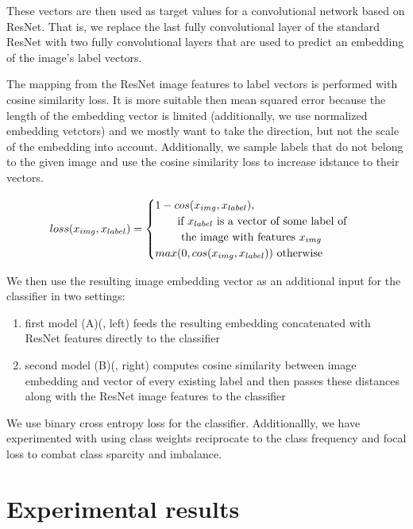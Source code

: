 \documentclass[10pt,twocolumn,letterpaper]{article}
\begin{document}
\par These vectors are then used as target values for a convolutional network based on ResNet\cite{he2015deep}. That is, we replace the last fully convolutional layer of the standard ResNet with two fully convolutional layers that are used to predict an embedding of the image's label vectors.
\par The mapping from the ResNet image features to label vectors is performed with cosine similarity loss. It is more suitable then mean squared error because the length of the embedding vector is limited (additionally, we use normalized embedding vetctors) and we mostly want to take the direction, but not the scale of the embedding into account. Additionally, we sample labels that do not belong to the given image and use the cosine similarity loss to increase idstance to their vectors.

\begin{align*}
loss(x_{img}, x_{label}) =
\begin{cases}
1-cos(x_{img}, x_{label}), \\ \text{\qquad if $x_{label}$ is a vector of some label of } \\ \text{ \qquad the image with features $x_{img}$}\\
max(0, cos(x_{img}, x_{label})) \text{ otherwise}
\end{cases}
\end{align*}
\par We then use the resulting image embedding vector as an additional input for the classifier in two settings:
\begin{enumerate}
	\item first model (A)(\cite{fig:arch}, left) feeds the resulting embedding concatenated with ResNet features directly to the classifier
	\item second model (B)(\cite{fig:arch}, right) computes cosine similarity between image embedding and vector of every existing label and then passes these distances along with the ResNet image features to the classifier
\end{enumerate}
\par We use binary cross entropy loss for the classifier. Additionallly, we have experimented with using class weights reciprocate to the class frequency and focal loss \cite{lin2017focal} to combat class sparcity and imbalance.

\section{Experimental results}
\end{document}
